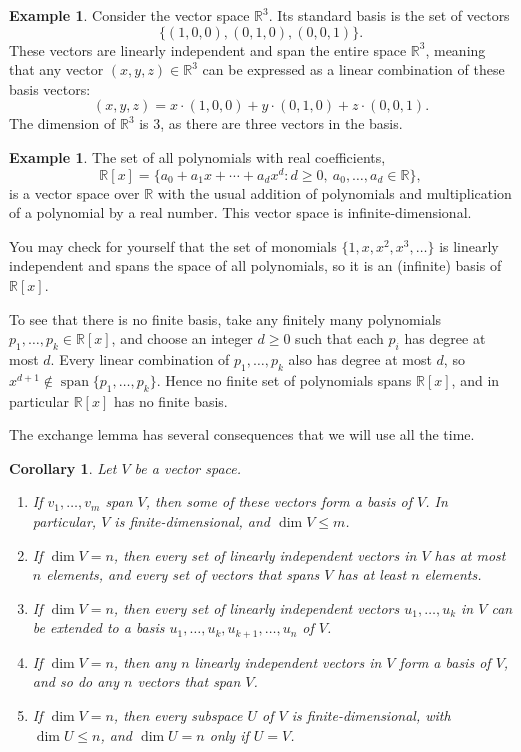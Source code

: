 \documentclass[11pt]{article}
\theoremstyle{definition}
\newtheorem{example}[definition]{Example}
\theoremstyle{plain}
\newtheorem{corollary}[definition]{Corollary}
\theoremstyle{remark}
\DeclareMathOperator{\Span}{span}
\begin{document}
\begin{example}
    Consider the vector space $\mathbb{R}^3$. Its standard basis is the set of vectors
    \[\{(1, 0, 0), (0, 1, 0), (0, 0, 1)\}.\]
    These vectors are linearly independent and span the entire space $\mathbb{R}^3$, meaning that any vector $(x, y, z) \in \mathbb{R}^3$ can be expressed as a linear combination of these basis vectors:
    \[(x, y, z) = x \cdot (1, 0, 0) + y \cdot (0, 1, 0) + z \cdot (0, 0, 1).\]
    The dimension of $\mathbb{R}^3$ is $3$, as there are three vectors in the basis.
\end{example}

\begin{example}
    The set of all polynomials with real coefficients,
    \[\mathbb{R}[x] = \{a_0 + a_1 x + \cdots + a_d x^d : d \geq 0, \ a_0, \ldots, a_d \in \mathbb{R}\},\]
    is a vector space over $\mathbb{R}$ with the usual addition of polynomials and multiplication of a polynomial by a real number. This vector space is infinite-dimensional.

    You may check for yourself that the set of monomials $\{1, x, x^2, x^3, \ldots\}$ is linearly independent and spans the space of all polynomials, so it is an (infinite) basis of $\mathbb{R}[x]$.

    To see that there is no finite basis, take any finitely many polynomials $p_1, \ldots, p_k \in \mathbb{R}[x]$, and choose an integer $d \geq 0$ such that each $p_i$ has degree at most $d$. Every linear combination of $p_1, \ldots, p_k$ also has degree at most $d$, so $x^{d+1} \notin \Span\{p_1, \ldots, p_k\}$. Hence no finite set of polynomials spans $\mathbb{R}[x]$, and in particular $\mathbb{R}[x]$ has no finite basis.
\end{example}

The exchange lemma has several consequences that we will use all the time.

\begin{corollary}\label{cor:dim-facts}
    Let $V$ be a vector space.
    \begin{enumerate}
        \item If $v_1, \ldots, v_m$ span $V$, then some of these vectors form a basis of $V$. In particular, $V$ is finite-dimensional, and $\dim V \leq m$.
        \item If $\dim V = n$, then every set of linearly independent vectors in $V$ has at most $n$ elements, and every set of vectors that spans $V$ has at least $n$ elements.
        \item If $\dim V = n$, then every set of linearly independent vectors $u_1, \ldots, u_k$ in $V$ can be extended to a basis $u_1, \ldots, u_k, u_{k+1}, \ldots, u_n$ of $V$.
        \item If $\dim V = n$, then any $n$ linearly independent vectors in $V$ form a basis of $V$, and so do any $n$ vectors that span $V$.
        \item If $\dim V = n$, then every subspace $U$ of $V$ is finite-dimensional, with $\dim U \leq n$, and $\dim U = n$ only if $U = V$.
    \end{enumerate}
\end{corollary}
\end{document}
